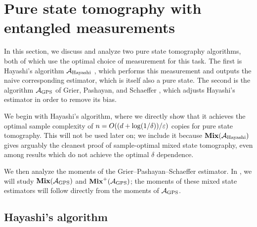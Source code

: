 \documentclass{article}
\newcommand{\mixed}{\textup{\textbf{Mix}}}
\newcommand{\gps}{\calA_{\mathrm{GPS}}}
\newcommand{\hayashi}{\calA_{\mathrm{Hayashi}}}
\begin{document}
\section{Pure state tomography with entangled measurements} \label{sec:entangled}

In this section, we discuss and analyze two pure state tomography algorithms, both of which use the optimal choice of measurement for this task.
The first is Hayashi's algorithm $\hayashi$ \cite{Hay98}, which performs this measurement and outputs the naive corresponding estimator, which is itself also a pure state.
The second is the algorithm $\gps$  of Grier, Pashayan, and Schaeffer \cite{GPS24}, which adjusts Hayashi's estimator in order to remove its bias.

We begin with Hayashi's algorithm, where we directly show that it achieves the optimal sample complexity of $n = O((d + \log(1/\delta))/\varepsilon)$ copies for pure state tomography.
This will not be used later on; we include it because $\mixed(\hayashi)$ gives arguably the cleanest proof of sample-optimal mixed state tomography, even among results which do not achieve the optimal $\delta$ dependence.

We then analyze the moments of the Grier--Pashayan--Schaeffer estimator.
In , we will study $\mixed(\gps)$ and $\mixed^+(\gps)$; the moments of these mixed state estimators will follow directly from the moments of $\gps$.

\subsection{Hayashi's algorithm}
\end{document}
